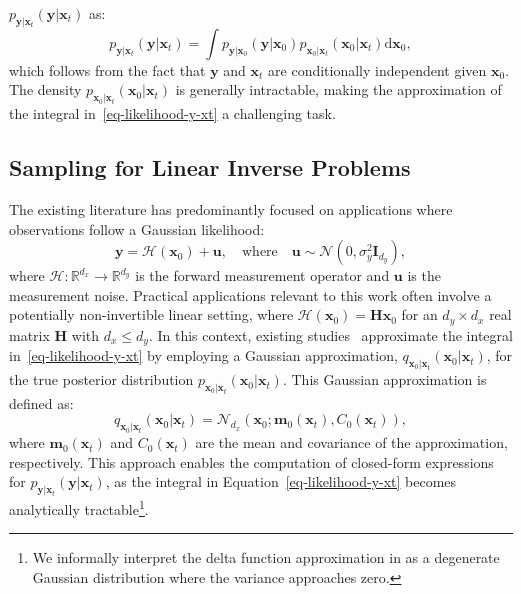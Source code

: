 $p_{\mathbf{y}|\mathbf{x}_t}(\mathbf{y}|\mathbf{x}_t )$ as:
\begin{equation}
\label{eq-likelihood-y-xt}
    p_{\mathbf{y}|\mathbf{x}_t}(\mathbf{y}|\mathbf{x}_t ) 
    = \int p_{\mathbf{y}|\mathbf{x}_0}(\mathbf{y}|\mathbf{x}_0) p_{\mathbf{x}_0|\mathbf{x}_t}(\mathbf{x}_0|\mathbf{x}_t) \mathrm{d}\mathbf{x}_0,
\end{equation} 
which follows from the fact that $\mathbf{y}$ and $\mathbf{x}_{t}$ are conditionally independent given $\mathbf{x}_{0}$. The density $p_{\mathbf{x}_0|\mathbf{x}_t}(\mathbf{x}_0|\mathbf{x}_t)$ is generally intractable, making the approximation of the integral in~\eqref{eq-likelihood-y-xt} a challenging task.


\subsection{Sampling for Linear Inverse Problems}
\label{sec-sampling-linear-inverse-problem}

The existing literature has predominantly focused on applications where observations follow a Gaussian likelihood:
\begin{equation*} 
    \mathbf{y} = \mathcal{H}( \mathbf{x}_0) + \mathbf{u}, \quad \text{where} \quad \mathbf{u} \sim \mathcal{N}(0, \sigma_y^2 \mathbf{I}_{d_y}),
\end{equation*}
where $\mathcal{H}:\mathbb{R}^{d_{x}}\to\mathbb{R}^{d_{y}}$ is the forward measurement operator and $\mathbf{u}$ is the measurement noise.
Practical applications relevant to this work often involve a potentially non-invertible linear setting, where $ \mathcal{H}(\mathbf{x}_0) = \mathbf{H}\mathbf{x}_0 $ for an $ d_{y} \times d_{x} $ real matrix $ \mathbf{H} $ with $ d_{x} \leq d_{y} $. In this context, existing studies~\cite{chung2023,song2023pseudoinverseguided, boys2024,rozet2024} approximate the integral in~\eqref{eq-likelihood-y-xt} by employing a Gaussian approximation, $ q_{\mathbf{x}_0|\mathbf{x}_t}(\mathbf{x}_0|\mathbf{x}_t) $, for the true posterior distribution $ p_{\mathbf{x}_0|\mathbf{x}_t}(\mathbf{x}_0|\mathbf{x}_t) $. This Gaussian approximation is defined as:  
\begin{equation*} %
q_{\mathbf{x}_0|\mathbf{x}_t}(\mathbf{x}_0|\mathbf{x}_t) = \mathcal{N}_{d_x}(\mathbf{x}_0; \mathbf{m}_0(\mathbf{x}_t), C_0(\mathbf{x}_t)),  
\end{equation*}  
where $ \mathbf{m}_0(\mathbf{x}_t) $ and $ C_0(\mathbf{x}_t) $ are the mean and covariance of the approximation, respectively. This approach enables the computation of closed-form expressions for $ p_{\mathbf{y}|\mathbf{x}_t}(\mathbf{y}|\mathbf{x}_t) $, as the integral in Equation~\eqref{eq-likelihood-y-xt} becomes analytically tractable\footnote{We informally interpret the delta function approximation in \citet{chung2023} as a degenerate Gaussian distribution where the variance approaches zero.}. 


